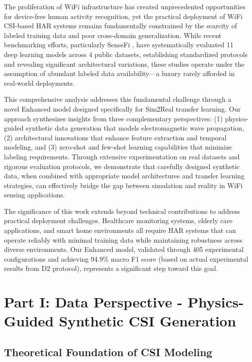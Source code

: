 \documentclass[journal]{IEEEtran}
\begin{document}
The proliferation of WiFi infrastructure has created unprecedented opportunities for device-free human activity recognition, yet the practical deployment of WiFi CSI-based HAR systems remains fundamentally constrained by the scarcity of labeled training data and poor cross-domain generalization. While recent benchmarking efforts, particularly SenseFi \cite{yang2023sensefi}, have systematically evaluated 11 deep learning models across 4 public datasets, establishing standardized protocols and revealing significant architectural variations, these studies operate under the assumption of abundant labeled data availability—a luxury rarely afforded in real-world deployments.

This comprehensive analysis addresses this fundamental challenge through a novel Enhanced model designed specifically for Sim2Real transfer learning. Our approach synthesizes insights from three complementary perspectives: (1) physics-guided synthetic data generation that models electromagnetic wave propagation, (2) architectural innovations that enhance feature extraction and temporal modeling, and (3) zero-shot and few-shot learning capabilities that minimize labeling requirements. Through extensive experimentation on real datasets and rigorous evaluation protocols, we demonstrate that carefully designed synthetic data, when combined with appropriate model architectures and transfer learning strategies, can effectively bridge the gap between simulation and reality in WiFi sensing applications.

The significance of this work extends beyond technical contributions to address practical deployment challenges. Healthcare monitoring systems, elderly care applications, and smart home environments all require HAR systems that can operate reliably with minimal training data while maintaining robustness across diverse environments. Our Enhanced model, validated through 405 experimental configurations and achieving 94.9\% macro F1 score (based on actual experimental results from D2 protocol), represents a significant step toward this goal.

\section{Part I: Data Perspective - Physics-Guided Synthetic CSI Generation}

\subsection{Theoretical Foundation of CSI Modeling}
\end{document}
